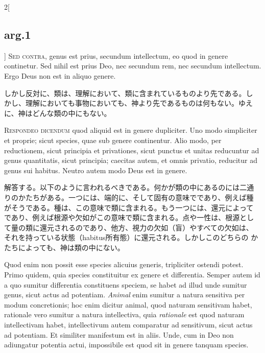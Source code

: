 \documentclass[paper=a4paper,fontsize=10pt,jafontsize=9pt,titlepage]{jlreq}
\begin{document}
\begin{paracol}{2}[\subsection{arg.1}]
{\scshape Sed contra}, genus est prius, secundum intellectum, eo quod
in genere continetur. Sed nihil est prius Deo, nec secundum rem, nec
secundum intellectum. Ergo Deus non est in aliquo genere.

\switchcolumn

しかし反対に、類は、理解において、類に含まれているものより先である。し
かし、理解においても事物においても、神より先であるものは何もない。ゆえ
に、神はどんな類の中にもない。


{\scshape Respondeo dicendum} quod aliquid est in genere dupliciter.
Uno modo simpliciter et proprie; sicut species, quae sub genere
continentur.  Alio modo, per reductionem, sicut principia et
privationes, sicut punctus et unitas reducuntur ad genus quantitatis,
sicut principia; caecitas autem, et omnis privatio, reducitur ad genus
sui habitus.  Neutro autem modo Deus est in genere.

\switchcolumn

解答する。以下のように言われるべきである。何かが類の中にあるのには二通
りのかたちがある。一つには、端的に、そして固有の意味でであり、例えば種
がそうである。種は、この意味で類に含まれる。もう一つには、還元によって
であり、例えば根源や欠如がこの意味で類に含まれる。点や一性は、根源とし
て量の類に還元されるのであり、他方、視力の欠如（盲）やすべての欠如は、
それを持っている状態（habitus所有態）に還元される。しかしこのどちらの
かたちによっても、神は類の中にない。

\switchcolumn*

Quod enim non possit esse species alicuius generis, tripliciter
ostendi potest.  Primo quidem, quia species constituitur ex genere et
differentia.  Semper autem id a quo sumitur differentia constituens
speciem, se habet ad illud unde sumitur genus, sicut actus ad
potentiam.  {\itshape Animal} enim sumitur a natura sensitiva per
modum concretionis; hoc enim dicitur animal, quod naturam sensitivam
habet, rationale vero sumitur a natura intellectiva, quia {\itshape
rationale} est quod naturam intellectivam habet, intellectivum autem
comparatur ad sensitivum, sicut actus ad potentiam. Et similiter
manifestum est in aliis.  Unde, cum in Deo non adiungatur potentia
actui, impossibile est quod sit in genere tanquam species.

\switchcolumn


\end{paracol}
\end{document}
